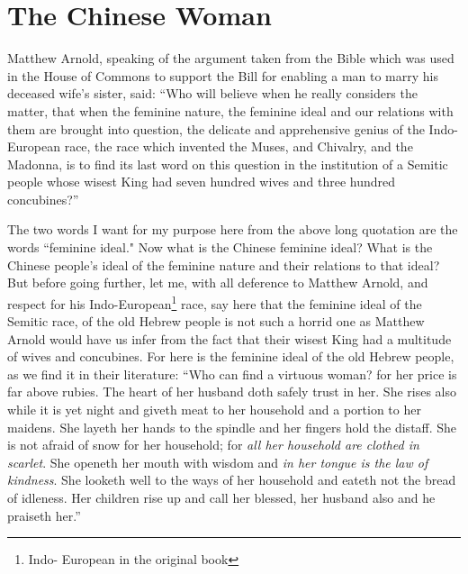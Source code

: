 \chapter{The Chinese Woman}
Matthew Arnold,  speaking of the argument taken from the Bible which was used in the House of Commons  to support the Bill for enabling a man to marry his deceased wife's sister, said: ``Who will believe when he really considers the matter, that when the feminine nature, the feminine ideal and our relations with them are brought into question, the delicate and apprehensive genius of the Indo-European race, the race which invented the Muses, and Chivalry, and the Madonna, is to find its last word on this question in the institution of a Semitic people whose wisest King had seven hundred wives and three hundred concubines?''

The two words I want for my purpose here from the above long quotation are the words ``feminine ideal." 
Now what is the Chinese feminine ideal?
What is the Chinese people's ideal of the feminine nature and their relations to that ideal?
But before going further, let me, with all deference to Matthew Arnold, and respect for his Indo-European\footnote{Indo- European in the original book} race, say here that the feminine ideal of the Semitic race, of the old Hebrew people is not such a horrid one as Matthew Arnold would have us infer from the fact that their wisest King had a multitude of wives and concubines.
For here is the feminine ideal of the old Hebrew people, as we find it in their literature: ``Who can find a virtuous woman? for her price is far above rubies.
The heart of her husband doth safely trust in her.
She rises also while it is yet night and giveth meat to her household and a portion to her maidens.
She layeth her hands to the spindle and her fingers hold the distaff.
She is not afraid of snow for her household; for \emph{all her household are clothed in scarlet}.
She openeth her mouth with wisdom and \emph{in her tongue is the law of kindness}.
She looketh well to the ways of her household and eateth not the bread of idleness.
Her children rise up and call her blessed, her husband also and he praiseth her.''

